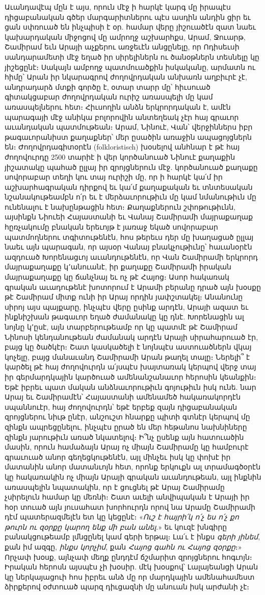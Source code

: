\documentclass{article}
\begin{document}
{Աւանդավէպ մըն է այս, որուն մէջ ի հարկէ կարգ մը իրապէս դիցաբանական գծեր մարգարիտներու պէս ասդին անդին ցիր եւ ցան սփռուած են ինչպիսի է օր. համար վերը յիշուածէն զատ նաեւ կախարդական միջոցով մը ամրողջ աշխարհքս, Արամ, Ջուարթ, Շամիրամ եւն Արայի աչքերու առջեւէն անցընելը, որ Ոդիսեւսի սանդարամետի մէջ եղած իր սիրելիներն ու ծանօթներն տեսնելը կը յիշեցընէ։ Սակայն ամբողջ պատմուածքին իսկականը, արմատն ու հիմը՝ Արան իր նկարագրով ժողովրդական անխառն աղբիւրէ չէ, անդրադարձ մտքի գործը է, օտար տարր մը՝ հիւսուած գիտակցաբար ժողովրդական ուրիշ առասպելի մը կամ առասպելներու հետ։ Հիւսողին անձն երկրորդական է, ամէն պարագայի մէջ անիկա բոլորովին անտեղեակ չէր հայ գրաւոր աւանդական պատմութեան։ Արամ, Նինուէ, Վան՝ վերջիններս իբր թագաւորանիստ քաղաքներ՝ մեր ըսածին առաջին ապացոյցներն են։ Ժողովրդագիտօրէն (folkloristisch) խօսելով անհնար է թէ հայ ժողովուրդը 2500 տարիէ ի վեր կործանուած Նինուէ քաղաքին յիշատակը պահած ըլլայ իր զրոյցներուն մէջ. կործանուած քաղաքը սովորաբար տեղի կու տայ ուրիշի մը, որ ի հարկէ կա՛մ իր աշխարհագրական դիրքով եւ կա՛մ քաղաքական եւ տնտեսական նշանակութեամբն ո՛ր եւ է մերձաւորութիւն մը կամ նմանութիւն մը ունենալու է նախընթացին հետ։ Քաղաքներուն շփոթութիւնն, այսինքն Նիուեի Հայաստանի եւ Վանայ Շամիրամի մայրաքաղաք հըռչակումը բնական երեւոյթ է յառաջ եկած սովորաբար պատմողներու տգիտութենէն, հոս թերեւս դեր մը խաղացած ըլլայ նաեւ այն պարագան, որ այսօր Վանայ բնակչութիւնը՝ հաւանօրէն ազդուած Խորենացւոյ աւանդութենէն, որ Վան Շամիրամի երկրորդ մայրաքաղաքը կ՚անուանէ, իր քաղաքը Շամիրամի իրական մայրաքաղաքը կը ճանչնայ եւ ոչ թէ Հայոց։ Ասոր հակառակ գրական աւադութենէ խոտորում է Արամի բերանը դրած այն խօսքը թէ Շամիրամ միտք ունի իր Արայ որդին յափշտակել։ Անանունը սիրոյ այս պայքարը, ինչպէս վերը ըսինք արդէն, Արայի ազատ եւ ինքնիշխան թագաւոր եղած ժամանակը կը դնէ. Խորենացին ալ նոյնը կ՚ըսէ, այն տարբերութեամբ որ կը պատմէ թէ Շամիրամ Նինոսի կենդանութեան ժամանակ արդէն Արայի սիրահարուած էր, բայց կը ծածկէր։ Շատ կասկածելի է նոյնպէս աստուածներն վկայ կոչելը, բայց մանաւանդ Շամիրամի Արան թաղել տալը։ Ներելի՞ է կարծել թէ հայ ժողովուրդն ա՛յսպէս խայտառակ կերպով վերջ տայ իր գերմարդկային կարծուած ամենանշանաւոր հերոսին կեանքին։ Եթէ իբրեւ պատ մական անձնաւորութիւն գոյութիւն իսկ ունե. նար Արայ եւ Շամիրամէն՝ Հայաստանի ամենամեծ հակառակորդէն սպաննուէր, հայ ժողովուրդն՝ եթէ երբեք զայն դիցաբանական զրոյցներու նիւթ ընէր, անշուշտ հնարքը պիտի գտնէր կերպով մը զինքն ապրեցընելու, ինչպէս ըրած են մեր հեթանոս նախնիները զինքն յարութիւն առած նկատելով։ Ի՞նչ ըսենք այն հատուածին մասին, որուն համաձայն Արայ ոչ միայն Շամիրամը կը համբուրէ գրաւուած անոր գեղեցկութենէն, այլ մինչեւ իսկ կը փոխէ իր մատանին անոր մատանւոյն հետ, որոնք երկուքն ալ տրամագծօրէն կը հակառակին ոչ միայն Արայի գրական աւանդութեան, այլ ինքնին առասպելին նպատակին, որ է ցուցնել թէ Արայ Շամիրամը չսիրելուն համար կը մեռնի։ Շատ աւելի անվիպական է Արայի իր հօր տուած այն յուսահատ խորհուրդն որով նա Արամը Շամիրամի դէմ պատերազմելէն ետ կը կեցընէ։ «\emph{Ուշ է հայրի՛կ ո՛չ ես ո՛չ քո թուրն ու զօրքը կարող ենք մի բան անել}.» եւ կուզէ խնգիրը բանակցութեամբ լմնցընել կամ գերի երթալ։ Լա՛ւ է ինքս \emph{գերի յինեմ}, քան իմ ազգը, \emph{ինքս կորչիմ}, քան \emph{Հայոց գահն ու Հայոց զօրքը}։» Որչափ խօսք, այնչափ մեղք ընդդէմ ճշմարիտ զրոյցներու հոգւոյն։ Իրական հերոսն այսպէս չի խօսիր. մէկ խօսքով՝ Լալայեանցի Արան կը ներկայացուի հոս իբրեւ անձ մը որ մարդկային ամենահամեստ ձիրքերով օժտուած պարզ դիւցազնի մը անուան իսկ արժանի չէ։

}
\end{document}
